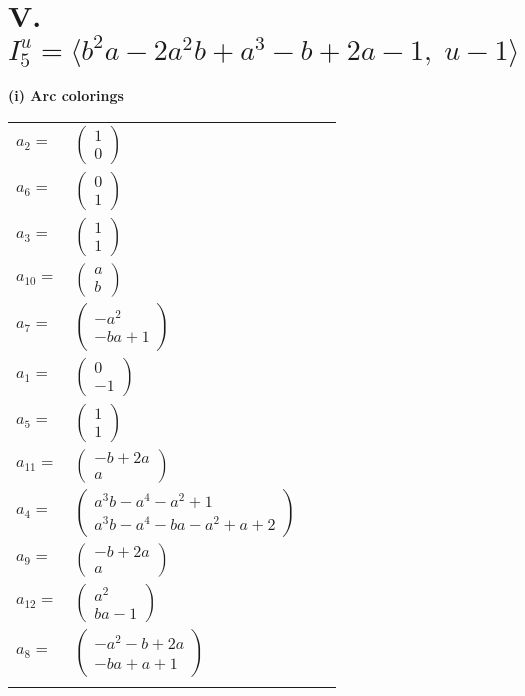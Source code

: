 \documentclass[1p]{elsarticle_modified}
\theoremstyle{definition}
\begin{document}
\centering \section*{V. $I^u_{5}= \langle b^2 a-2 a^2 b+a^3- b+2 a-1,\;u-1 \rangle$}
\flushleft \textbf{(i) Arc colorings}\\
\begin{tabular}{m{7pt} m{180pt} m{7pt} m{180pt} }
\flushright $a_{2}=$&$\begin{pmatrix}1\\0\end{pmatrix}$ \\
\flushright $a_{6}=$&$\begin{pmatrix}0\\1\end{pmatrix}$ \\
\flushright $a_{3}=$&$\begin{pmatrix}1\\1\end{pmatrix}$ \\
\flushright $a_{10}=$&$\begin{pmatrix}a\\b\end{pmatrix}$ \\
\flushright $a_{7}=$&$\begin{pmatrix}- a^2\\- b a+1\end{pmatrix}$ \\
\flushright $a_{1}=$&$\begin{pmatrix}0\\-1\end{pmatrix}$ \\
\flushright $a_{5}=$&$\begin{pmatrix}1\\1\end{pmatrix}$ \\
\flushright $a_{11}=$&$\begin{pmatrix}- b+2 a\\a\end{pmatrix}$ \\
\flushright $a_{4}=$&$\begin{pmatrix}a^3 b- a^4- a^2+1\\a^3 b- a^4- b a- a^2+a+2\end{pmatrix}$ \\
\flushright $a_{9}=$&$\begin{pmatrix}- b+2 a\\a\end{pmatrix}$ \\
\flushright $a_{12}=$&$\begin{pmatrix}a^2\\b a-1\end{pmatrix}$ \\
\flushright $a_{8}=$&$\begin{pmatrix}- a^2- b+2 a\\- b a+a+1\end{pmatrix}$\\&\end{tabular}
\end{document}
